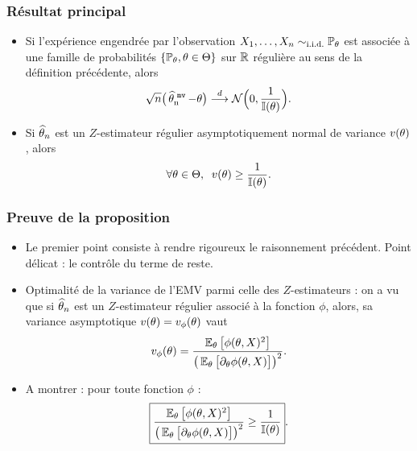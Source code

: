 \begin{frame}
\frametitle{Résultat principal}
\begin{prop}
\begin{itemize}
\item Si l'expérience engendrée par l'observation $X_1,\ldots, X_n\sim_{\text{i.i.d.}}\operatorname{{\mathbb P}}_\theta$ est associée à une famille de probabilités $\{\operatorname{{\mathbb P}}_\theta, \theta \in \Theta\}$ sur $\operatorname{{\mathbb R}}$ \alert{ régulière} au sens de la définition précédente, alors
$$\sqrt{n}\big(\operatorname{\widehat \theta_n^{\,\,{\tt mv}}}-\theta\big) \stackrel{d}{\longrightarrow} {\mathcal N}\Big(0,\frac{1}{\mathbb{I}(\theta)}\Big).$$
\item Si $\operatorname{\widehat \theta_{\mathnormal{n}}}$ est un $Z$-estimateur \alert{régulier} asymptotiquement normal de variance $v(\theta)$, alors
$$\forall \theta \in \Theta,\;\;v(\theta) \geq \frac{1}{\mathbb{I}(\theta)}.$$
\end{itemize}
\end{prop}
\end{frame}

\begin{frame}
\frametitle{Preuve de la proposition}
\begin{itemize}
\item Le premier point consiste à \alert{rendre rigoureux} le raisonnement précédent. \alert{Point délicat : } le contrôle du terme de reste.
\item \alert{Optimalité de la variance de l'EMV parmi celle des $Z$-estimateurs} : on a vu que si $\operatorname{\widehat \theta_{\mathnormal{n}}}$ est un $Z$-estimateur régulier associé à la fonction $\phi$, alors, sa variance asymptotique $v(\theta) = v_\phi(\theta)$ vaut
$$v_\phi(\theta) = \frac{\operatorname{{\mathbb E}}_\theta\big[\phi(\theta,X)^2\big]}{\big(\operatorname{{\mathbb E}}_\theta\big[\partial_\theta \phi(\theta, X)\big]\big)^2}.$$
\item \alert{A montrer} : pour toute fonction $\phi$ :
$$\boxed{\frac{\operatorname{{\mathbb E}}_\theta\big[\phi(\theta,X)^2\big]}{\big(\operatorname{{\mathbb E}}_\theta\big[\partial_\theta \phi(\theta, X)\big]\big)^2} \geq \frac{1}{\mathbb{I}(\theta)}}.$$
\end{itemize}
\end{frame}

